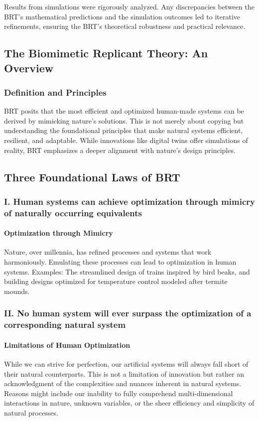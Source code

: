 \documentclass[sn-nature]{sn-jnl}%
\theoremstyle{thmstyleone}%
\theoremstyle{thmstyletwo}%
\theoremstyle{thmstylethree}%
\begin{document}
Results from simulations were rigorously analyzed. Any discrepancies between the BRT's mathematical predictions and the simulation outcomes led to iterative refinements, ensuring the BRT's theoretical robustness and practical relevance.
\subsection{The Biomimetic Replicant Theory: An Overview}
\subsubsection{Definition and Principles}
BRT posits that the most efficient and optimized human-made systems can be derived by mimicking nature's solutions. This is not merely about copying but understanding the foundational principles that make natural systems efficient, resilient, and adaptable. While innovations like digital twins offer simulations of reality, BRT emphasizes a deeper alignment with nature's design principles\cite{tao_digital_2018}.
\subsection{Three Foundational Laws of BRT}
\subsubsection*{I. Human systems can achieve optimization through mimicry of naturally occurring equivalents }
\paragraph{Optimization through Mimicry}
Nature, over millennia, has refined processes and systems that work harmoniously. Emulating these processes can lead to optimization in human systems\cite{benyus_biomimicry_2009}.
Examples: The streamlined design of trains inspired by bird beaks, and building designs optimized for temperature control modeled after termite mounds.
\subsubsection*{II. No human system will ever surpass the optimization of a corresponding natural
system}
\paragraph{Limitations of Human Optimization}
While we can strive for perfection, our artificial systems will always fall short of their natural counterparts. This is not a limitation of innovation but rather an acknowledgment of the complexities and nuances inherent in natural systems\cite{west_scale_2017}\cite{noble_theory_2012}.
Reasons might include our inability to fully comprehend multi-dimensional interactions in nature, unknown variables, or the sheer efficiency and simplicity of natural processes.
\end{document}
